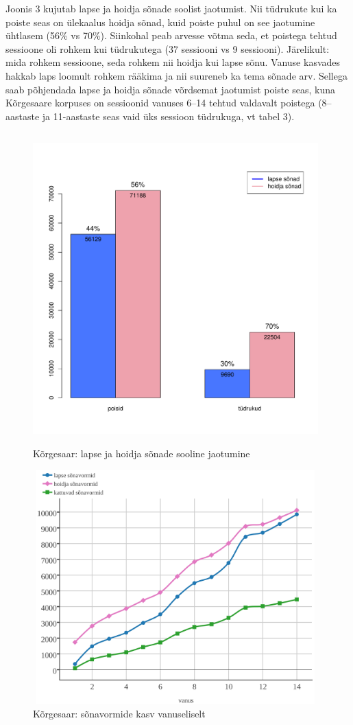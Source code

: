 \documentclass[12pt]{article}
\begin{document}
Joonis 3 kujutab lapse ja hoidja sõnade soolist jaotumist. Nii tüdrukute kui ka poiste seas on ülekaalus hoidja sõnad, kuid poiste puhul on see jaotumine ühtlasem (56\% vs 70\%). Siinkohal peab arvesse võtma seda, et poistega tehtud sessioone oli rohkem kui tüdrukutega (37 sessiooni vs 9 sessiooni). Järelikult: mida rohkem sessioone, seda rohkem nii hoidja kui lapse sõnu. Vanuse kasvades hakkab laps loomult rohkem rääkima ja nii suureneb ka tema sõnade arv. Sellega saab põhjendada lapse ja hoidja sõnade võrdsemat jaotumist poiste seas, kuna Kõrgesaare korpuses on sessioonid vanuses 6--14 tehtud valdavalt poistega (8--aastaste ja 11-aastaste seas vaid üks sessioon tüdrukuga, vt tabel 3).

\begin{figure}[H]
    \centering
    \includegraphics[width=11cm, height=12cm]{korgesaar_sugu_sonad}
    \caption{Kõrgesaar: lapse ja hoidja sõnade sooline jaotumine}
\end{figure}



\begin{figure}[H]
    \centering
    \includegraphics[width=11cm, height=9cm]{korgesaar_kum_crop}
    \caption{Kõrgesaar: sõnavormide kasv vanuseliselt}
\end{figure}
\end{document}
